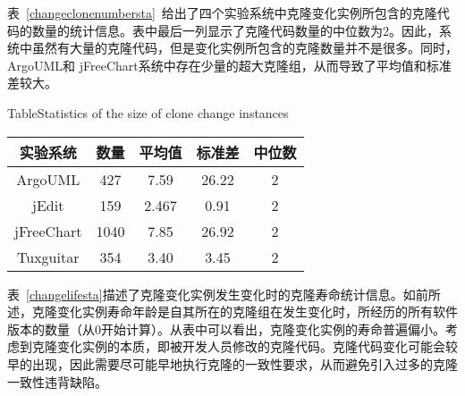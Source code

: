 表~\ref{changeclonenumbersta}~给出了四个实验系统中克隆变化实例所包含的克隆代码的数量的统计信息。表中最后一列显示了克隆代码数量的中位数为2。因此，系统中虽然有大量的克隆代码，但是变化实例所包含的克隆数量并不是很多。同时，ArgoUML和 jFreeChart系统中存在少量的超大克隆组，从而导致了平均值和标准差较大。

\begin{table}[htbp]
{Table$\!$}{Statistics of the size of clone change instances}
\vspace{0.5em}
\centering
\wuhao
\begin{tabular}{ccccc}
\toprule[1.5pt]
{实验系统}&{数量}&{平均值}&{标准差}&{中位数}\\ 
\midrule[1pt]
ArgoUML&427&7.59&	26.22&2\\
jEdit&159&	2.467&	0.91&2\\ 
jFreeChart&1040&	7.85&	26.92&2\\
Tuxguitar&354&	3.40	&3.45&2\\ 
\bottomrule[1.5pt]
\end{tabular}
\end{table}


表~\ref{changelifesta}描述了克隆变化实例发生变化时的克隆寿命统计信息。如前所述，克隆变化实例寿命年龄是自其所在的克隆组在发生变化时，所经历的所有软件版本的数量（从$0$开始计算）。从表中可以看出，克隆变化实例的寿命普遍偏小。考虑到克隆变化实例的本质，即被开发人员修改的克隆代码。克隆代码变化可能会较早的出现，因此需要尽可能早地执行克隆的一致性要求，从而避免引入过多的克隆一致性违背缺陷。


